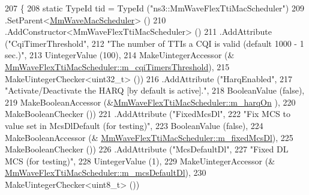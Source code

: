 \begin{DoxyCode}
207 \{
208         \textcolor{keyword}{static} TypeId tid = TypeId (\textcolor{stringliteral}{"ns3::MmWaveFlexTtiMacScheduler"})
209             .SetParent<\hyperlink{classns3_1_1MmWaveMacScheduler_aad32d6753e98fe1699402d1a722835c4}{MmWaveMacScheduler}> ()
210                 .AddConstructor<MmWaveFlexTtiMacScheduler> ()
211     .AddAttribute (\textcolor{stringliteral}{"CqiTimerThreshold"},
212                    \textcolor{stringliteral}{"The number of TTIs a CQI is valid (default 1000 - 1 sec.)"},
213                    UintegerValue (100),
214                    MakeUintegerAccessor (&
      \hyperlink{classns3_1_1MmWaveFlexTtiMacScheduler_ab79b59a03053301ed05f22fdb701a7ef}{MmWaveFlexTtiMacScheduler::m\_cqiTimersThreshold}),
215                    MakeUintegerChecker<uint32\_t> ())
216     .AddAttribute (\textcolor{stringliteral}{"HarqEnabled"},
217                    \textcolor{stringliteral}{"Activate/Deactivate the HARQ [by default is active]."},
218                    BooleanValue (\textcolor{keyword}{false}),
219                    MakeBooleanAccessor (&\hyperlink{classns3_1_1MmWaveFlexTtiMacScheduler_a832729b006315bb770e9f50c16305118}{MmWaveFlexTtiMacScheduler::m\_harqOn}
      ),
220                    MakeBooleanChecker ())
221          .AddAttribute (\textcolor{stringliteral}{"FixedMcsDl"},
222                                                                         \textcolor{stringliteral}{"Fix MCS to value set in
       McsDlDefault (for testing)"},
223                                                                         BooleanValue (\textcolor{keyword}{false}),
224                                                                         MakeBooleanAccessor (&
      \hyperlink{classns3_1_1MmWaveFlexTtiMacScheduler_a310495cea515a335d1dfcc4d623b9b0a}{MmWaveFlexTtiMacScheduler::m\_fixedMcsDl}),
225                                                                         MakeBooleanChecker ())
226         .AddAttribute (\textcolor{stringliteral}{"McsDefaultDl"},
227                                                                  \textcolor{stringliteral}{"Fixed DL MCS (for testing)"},
228                                                                  UintegerValue (1),
229                                                                  MakeUintegerAccessor (&
      \hyperlink{classns3_1_1MmWaveFlexTtiMacScheduler_ae439c9faae5c2544276b639aa2778521}{MmWaveFlexTtiMacScheduler::m\_mcsDefaultDl}),
230                                                                  MakeUintegerChecker<uint8\_t> ())

\end{DoxyCode}
